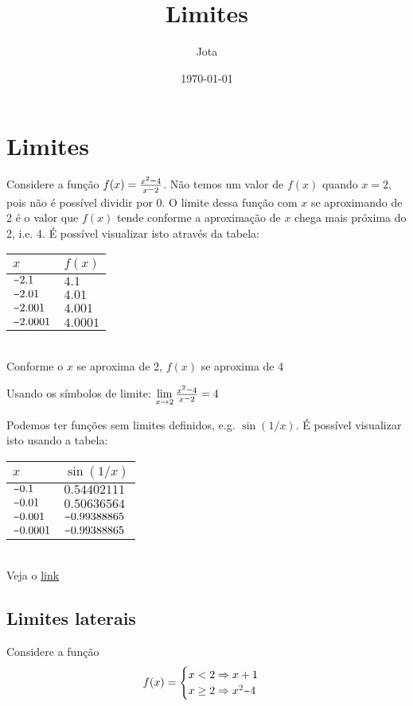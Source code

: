 \documentclass[12pt,a4paper,brazil]{article}
\title{Limites}
\author{Jota}
\date{\today}
\newcommand{\minus}{\scalebox{0.75}[1.0]{$-$}}
\begin{document}
\maketitle

\section{\textbf{Limites}}
Considere a função $f(x) = \frac{x^2 \minus 4}{x\minus2}$.
Não temos um valor de $f(x)$ quando $x=2$, pois não é possível dividir por 0.
O limite dessa função com $x$ se aproximando de 2 é o valor que $f(x)$ tende conforme
a aproximação de $x$ chega mais próxima do 2, i.e. 4. É possível visualizar isto através da tabela:
\begin{center}
	\begin{tabular}{l|l}
		$x$       	   & $f(x)$  \\ \hline
		$\minus2.1$    & $4.1$   \\
		$\minus2.01$   & $4.01$  \\
		$\minus2.001$  & $4.001$ \\
		$\minus2.0001$ & $4.0001$ 
	\end{tabular} \\
	Conforme o $x$ se aproxima de 2, $f(x)$ se aproxima de 4
\end{center}
Usando os símbolos de limite: $\lim\limits_{x \to 2} \frac{x^2 \minus 4}{x\minus2} = 4$

Podemos ter funções sem limites definidos, e.g. $\sin(1/x)$. É possível visualizar isto usando a tabela:
\begin{center}
	\begin{tabular}{l|l}
		$x$       & $\sin(1/x)$     \\ \hline
		$\minus0.1$    & $0.54402111$  \\
		$\minus0.01$   & $0.50636564$  \\
		$\minus0.001$  & $\minus0.99388865$ \\
		$\minus0.0001$ & $\minus0.99388865$ 
	\end{tabular} \\
	Veja o \href{https://www.mathway.com/pt/popular-problems/Calculus/501510}{link}
\end{center}

\subsection{\textbf{Limites laterais}}
Considere a função \[f(x) =
	\begin{cases}
		x < 2 \Rightarrow x + 1 \\
		x \ge 2 \Rightarrow x^2 \minus 4
	\end{cases}
\]
\end{document}
